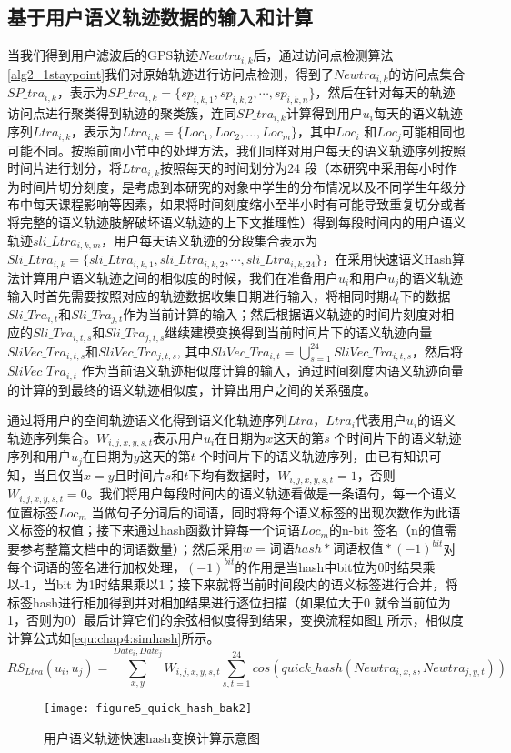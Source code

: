 \subsection{基于用户语义轨迹数据的输入和计算}
当我们得到用户滤波后的GPS轨迹$Newtra_{i,k}$后，通过访问点检测算法\ref{alg2_1staypoint}我们对原始轨迹进行访问点检测，得到了$Newtra_{i,k}$的访问点集合$SP\_tra_{i,k}$，表示为$SP\_tra_{i,k}=\{ sp_{i,k,1},sp_{i,k,2},\cdots , sp_{i,k,n} \}$，然后在针对每天的轨迹访问点进行聚类得到轨迹的聚类簇，连同$SP\_tra_{i,k}$计算得到用户$u_{i}$每天的语义轨迹序列$Ltra_{i,k}$，表示为$ Ltra_{i,k}=\{Loc_{1},Loc_{2},...,Loc_{m}\}$，其中$Loc_{i}$ 和$Loc_{j}$可能相同也可能不同。按照前面小节中的处理方法，我们同样对用户每天的语义轨迹序列按照时间片进行划分，将$ Ltra_{i,k}$按照每天的时间划分为24 段（本研究中采用每小时作为时间片切分刻度，是考虑到本研究的对象中学生的分布情况以及不同学生年级分布中每天课程影响等因素，如果将时间刻度缩小至半小时有可能导致重复切分或者将完整的语义轨迹肢解破坏语义轨迹的上下文推理性）得到每段时间内的用户语义轨迹$sli\_Ltra_{i,k,m}$，用户每天语义轨迹的分段集合表示为$Sli\_Ltra_{i,k}=\{sli\_Ltra_{i,k,1},sli\_Ltra_{i,k,2},\cdots,sli\_Ltra_{i,k,24}\}$，在采用快速语义Hash算法计算用户语义轨迹之间的相似度的时候，我们在准备用户$u_{i}$和用户$u_{j}$的语义轨迹输入时首先需要按照对应的轨迹数据收集日期进行输入，将相同时期$d_{t}$下的数据$Sli\_Tra_{i,t}$和$Sli\_Tra_{j,t}$作为当前计算的输入；然后根据语义轨迹的时间片刻度对相应的$Sli\_Tra_{i,t,s}$和$Sli\_Tra_{j,t,s}$继续建模变换得到当前时间片下的语义轨迹向量$SliVec\_Tra_{i,t,s}$和$SliVec\_Tra_{j,t,s}$, 其中$SliVec\_Tra_{i,t}=\bigcup_{s=1}^{24}SliVec\_Tra_{i,t,s}$，然后将$SliVec\_Tra_{i,t}$ 作为当前语义轨迹相似度计算的输入，通过时间刻度内语义轨迹向量的计算的到最终的语义轨迹相似度，计算出用户之间的关系强度。
\par 通过将用户的空间轨迹语义化得到语义化轨迹序列$Ltra$，$Ltra_{i}$代表用户$u_{i}$的语义轨迹序列集合。$W_{i,j,x,y,s,t}$表示用户$u_{i}$在日期为$x$这天的第$s$ 个时间片下的语义轨迹序列和用户$u_{j}$在日期为$y$这天的第$t$ 个时间片下的语义轨迹序列，由已有知识可知，当且仅当$x=y$且时间片$s$和$t$下均有数据时，$W_{i,j,x,y,s,t}=1$，否则$W_{i,j,x,y,s,t}=0$。我们将用户每段时间内的语义轨迹看做是一条语句，每一个语义位置标签$Loc_{m}$ 当做句子分词后的词语，同时将每个语义标签的出现次数作为此语义标签的权值；接下来通过hash函数计算每一个词语$Loc_{m}$的n-bit 签名（n的值需要参考整篇文档中的词语数量）；然后采用$w=\text{词语}hash*\text{词语权值}*(-1)^{bit}$对每个词语的签名进行加权处理，$(-1)^{bit}$的作用是当hash中bit位为0时结果乘以-1，当bit 为1时结果乘以1；接下来就将当前时间段内的语义标签进行合并，将标签hash进行相加得到并对相加结果进行逐位扫描（如果位大于0 就令当前位为1，否则为0）最后计算它们的余弦相似度得到结果，变换流程如图\ref{fig:quick_hash} 所示，相似度计算公式如\ref{equ:chap4:simhash}所示。
\begin{equation}
\label{equ:chap4:simhash}
RS_{Ltra}(u_{i},u_{j})=\sum_{x ,y }^{ Date_{i}, Date_{j}}W_{i,j,x,y,s,t}\sum_{s,t=1}^{24} cos(quick\_hash(Newtra_{i,x,s},Newtra_{j,y,t}))
\end{equation}
\begin{figure}[htb]
\centering
\texttt{[image: figure5\_quick\_hash\_bak2]}
\caption{用户语义轨迹快速hash变换计算示意图}
\label{fig:quick_hash}
\end{figure}


